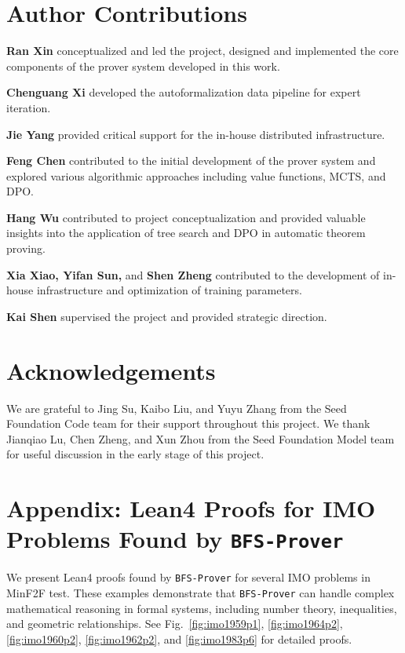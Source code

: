 \documentclass[10pt,english]{article}
\begin{document}
\newpage
\section*{Author Contributions}
\textbf{Ran Xin} conceptualized and led the project, designed and implemented the core components of the prover system developed in this work.

\textbf{Chenguang Xi} developed the autoformalization data pipeline for expert iteration.

\textbf{Jie Yang} provided critical support for the in-house distributed infrastructure.

\textbf{Feng Chen} contributed to the initial development of the prover system and explored various algorithmic approaches including value functions, MCTS, and DPO.

\textbf{Hang Wu} contributed to project conceptualization and provided valuable insights into the application of tree search and DPO in automatic theorem proving.

\textbf{Xia Xiao, Yifan Sun,} and \textbf{Shen Zheng} contributed to the development of in-house infrastructure and optimization of training parameters.


\textbf{Kai Shen} supervised the project and provided strategic direction.

\section*{Acknowledgements}
We are grateful to Jing Su, Kaibo Liu, and Yuyu Zhang from the Seed Foundation Code team for their support throughout this project. We thank Jianqiao Lu, Chen Zheng, and Xun Zhou from the Seed Foundation Model team for useful discussion in the early stage of this project.






\appendix

\section*{Appendix: Lean4 Proofs for IMO Problems Found by \texttt{BFS-Prover}}
We present Lean4 proofs found by \texttt{BFS-Prover} for several IMO problems in MinF2F test. These examples demonstrate that \texttt{BFS-Prover} can handle complex mathematical reasoning in formal systems, including number theory, inequalities, and geometric relationships. See Fig.~\ref{fig:imo1959p1}, \ref{fig:imo1964p2}, \ref{fig:imo1960p2}, \ref{fig:imo1962p2}, and \ref{fig:imo1983p6} for detailed proofs.
\end{document}
